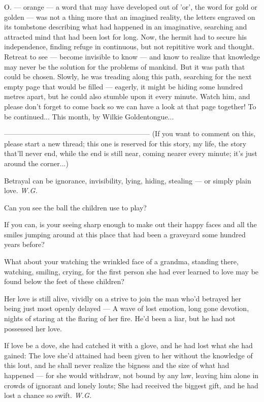 O. --- orange --- a word that may have developed out of 'or', the word for gold or golden --- was not a thing more that an imagined reality, the letters engraved on its tombstone describing what had happened in an imaginative, searching and attracted mind that had been lost for long. 
Now, the hermit had to secure his independence, finding refuge in continuous, but not repititive work and thought. Retreat to see --- become invisible to know --- and know to realize that knowledge may never be the solution for the problems of mankind. 
But it was path that could be chosen. 
Slowly, he was treading along this path, searching for the next empty page that would be filled --- eagerly, it might be hiding some hundred metres apart, but he could also stumble upon it every minute. 
Watch him, and please don't forget to come back so we can have a look at that page together! 
To be continued...
This month, by Wilkie Goldentongue...

--------------------------------------------------------------
(If you want to comment on this, please start a new thread; this one is reserved for this story, my life, the story that'll never end, while the end is still near, coming nearer every minute; it's just around the corner...)

Betrayal 
can be ignorance, 
invisibility, 
lying, 
hiding, 
stealing --- 
or simply 
plain love. 
\emph{W.G.}

Can you see the ball 
the children use to play? 

If you can, 
is your seeing sharp enough 
to make out their happy faces 
and all the smiles jumping around 
at this place that had been a graveyard 
some hundred years before? 

What about your watching 
the wrinkled face of a grandma, 
standing there, 
watching, 
smiling, 
crying, 
for the first person she had ever learned 
to love 
may be found below the feet of these children? 

Her love is still alive, 
vividly on a strive 
to join the man who'd betrayed 
her being just most openly delayed --- 
A wave of lost emotion, 
long gone devotion, 
nights of staring 
at the flaring 
of her fire. 
He'd been a liar, 
but he had not possessed her love. 

If love be a dove, 
she had catched it with a glove, 
and he had lost what she had gained: 
The love she'd attained 
had been given to her without 
the knowledge of this lout, 
and he shall never realize 
the bigness and the size 
of what had happened --- 
for she would withdraw, 
not bound by any law, 
leaving him alone in crowds 
of ignorant and lonely louts; 
She had received the biggest gift, 
and he had lost a chance so swift. 
\emph{W.G.}
